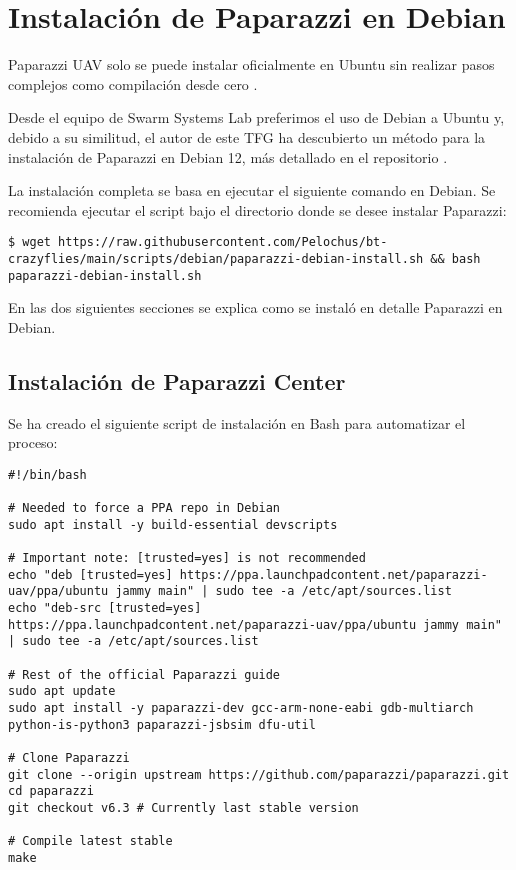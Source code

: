 \appendix

\chapter{Instalación de Paparazzi en Debian}\label{appendix:debian_install}

Paparazzi UAV solo se puede instalar oficialmente en Ubuntu \cite{paparazzi_center_install} sin realizar pasos complejos como compilación desde cero \cite{paparazzi_scratch_install}.

Desde el equipo de Swarm Systems Lab preferimos el uso de Debian a Ubuntu y, debido a su similitud,
el autor de este TFG ha descubierto un método para la instalación de Paparazzi en Debian 12, más detallado en el repositorio \cite{bt-crazyflies}.

La instalación completa se basa en ejecutar el siguiente comando en Debian. Se recomienda ejecutar el script bajo el directorio donde se desee instalar Paparazzi:

\begin{lstlisting}[style=CodigoBash]
$ wget https://raw.githubusercontent.com/Pelochus/bt-crazyflies/main/scripts/debian/paparazzi-debian-install.sh && bash paparazzi-debian-install.sh
\end{lstlisting}

En las dos siguientes secciones se explica como se instaló en detalle Paparazzi en Debian.

\section{Instalación de Paparazzi Center}

Se ha creado el siguiente script de instalación en Bash para automatizar el proceso:

\begin{lstlisting}[style=CodigoBash]
#!/bin/bash

# Needed to force a PPA repo in Debian
sudo apt install -y build-essential devscripts

# Important note: [trusted=yes] is not recommended
echo "deb [trusted=yes] https://ppa.launchpadcontent.net/paparazzi-uav/ppa/ubuntu jammy main" | sudo tee -a /etc/apt/sources.list
echo "deb-src [trusted=yes] https://ppa.launchpadcontent.net/paparazzi-uav/ppa/ubuntu jammy main" | sudo tee -a /etc/apt/sources.list

# Rest of the official Paparazzi guide
sudo apt update
sudo apt install -y paparazzi-dev gcc-arm-none-eabi gdb-multiarch python-is-python3 paparazzi-jsbsim dfu-util

# Clone Paparazzi
git clone --origin upstream https://github.com/paparazzi/paparazzi.git
cd paparazzi
git checkout v6.3 # Currently last stable version

# Compile latest stable
make
\end{lstlisting}

